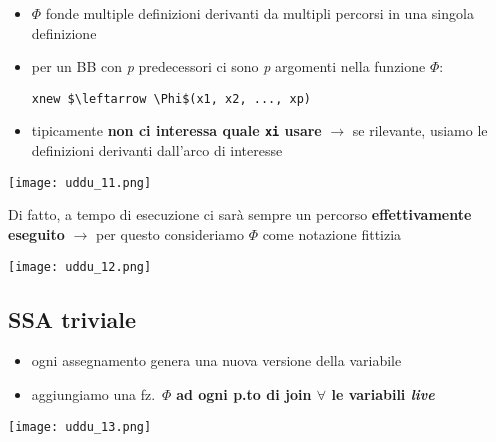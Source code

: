\noindent\begin{minipage}[c]{.65\textwidth}
\begin{itemize}
  \item $\Phi$ fonde multiple definizioni derivanti da multipli percorsi in una singola definizione
  \item per un BB con \textit{p} predecessori ci sono \textit{p} argomenti nella funzione $\Phi$:
  \begin{lstlisting}
xnew $\leftarrow \Phi$(x1, x2, ..., xp)\end{lstlisting}
\item tipicamente \textbf{non ci interessa quale \lstinline|xi| usare} $\rightarrow$ se rilevante, usiamo le definizioni derivanti dall'arco di interesse
\end{itemize}
\end{minipage}\hfill
\begin{minipage}[c]{.3\textwidth}
\texttt{[image: uddu\_11.png]}
\end{minipage}

\begin{example}[frametitle={Come si implementa $\Phi$}]
  \noindent \begin{minipage}[c]{.5\textwidth}
    Di fatto, a tempo di esecuzione ci sar\`a sempre un percorso \textbf{effettivamente eseguito} $\rightarrow$ per questo consideriamo $\Phi$ come notazione fittizia
  \end{minipage}\hfill
  \begin{minipage}[c]{.3\textwidth}
    \texttt{[image: uddu\_12.png]}
  \end{minipage}
\end{example}

\subsection{SSA triviale}

\noindent \begin{minipage}[c]{.4\textwidth}
\begin{itemize}
  \item ogni assegnamento genera una nuova versione della variabile
  \item aggiungiamo una fz.~$\Phi$ \textbf{ad ogni p.to di join $\forall$ le variabili \textit{live}}  
\end{itemize}
\end{minipage}\hfill
\begin{minipage}[c]{.55\textwidth}
  \centering
\texttt{[image: uddu\_13.png]}
\end{minipage}

